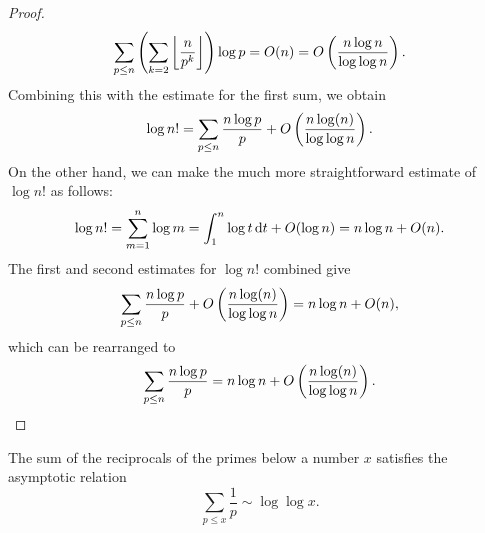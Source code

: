 \begin{proof}
\begin{equation*}
    \sum_{p\leq n}\left(\sum_{k=2}\left\lfloor\frac{n}{p^k}\right\rfloor\right)\log p = O(n) = O\left(\frac{n\log n}{\log\log n}\right).
  \end{equation*}
  Combining this with the estimate for the first sum, we obtain
  \begin{equation*}
    \log n! = \sum_{p\leq n}\frac{n\log p}{p} + O\left(\frac{n\log(n)}{\log\log n}\right).
  \end{equation*}
  On the other hand, we can make the much more straightforward estimate of $\log n!$ as follows:
  \begin{equation*}
    \log n! = \sum_{m=1}^n \log m = \int_{1}^n\log t\,\mathrm{d}t+O(\log n) = n\log n + O(n).
  \end{equation*}
  The first and second estimates for $\log n!$ combined give
  \begin{equation*}
    \sum_{p\leq n}\frac{n\log p}{p} + O\left(\frac{n\log(n)}{\log\log n}\right) = n\log n + O(n),
  \end{equation*}
  which can be rearranged to
  \begin{equation*}
    \sum_{p\leq n}\frac{n\log p}{p} = n\log n + O\left(\frac{n\log(n)}{\log\log n}\right).\qedhere
  \end{equation*}
\end{proof}

\begin{theorem}
  The sum of the reciprocals of the primes below a number $x$ satisfies the asymptotic relation
  \begin{equation*}
    \sum_{p\leq x}\frac{1}{p}\sim \log \log x.
  \end{equation*}
\end{theorem}

